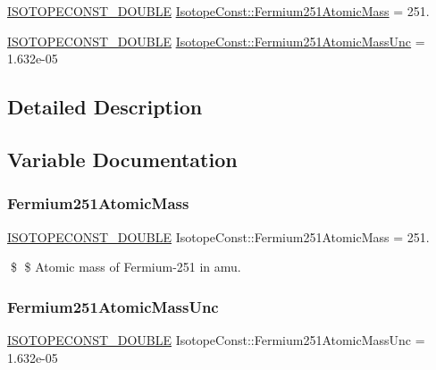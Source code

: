 \begin{DoxyCompactItemize}
\item 
\mbox{\hyperlink{group___isotope_const-_macros_ga8f45a7272ce02c0b4c65c44636ed719a}{I\+S\+O\+T\+O\+P\+E\+C\+O\+N\+S\+T\+\_\+\+D\+O\+U\+B\+LE}} \mbox{\hyperlink{group___isotope_const-_fermium-_fm251_ga72c1d25ba778ce4d444ea32fa1d19a0d}{Isotope\+Const\+::\+Fermium251\+Atomic\+Mass}} = 251.
\item 
\mbox{\hyperlink{group___isotope_const-_macros_ga8f45a7272ce02c0b4c65c44636ed719a}{I\+S\+O\+T\+O\+P\+E\+C\+O\+N\+S\+T\+\_\+\+D\+O\+U\+B\+LE}} \mbox{\hyperlink{group___isotope_const-_fermium-_fm251_ga301bdffa0dde7a800817c16291698988}{Isotope\+Const\+::\+Fermium251\+Atomic\+Mass\+Unc}} = 1.\+632e-\/05
\end{DoxyCompactItemize}


\subsection{Detailed Description}


\subsection{Variable Documentation}
\mbox{\label{group___isotope_const-_fermium-_fm251_ga72c1d25ba778ce4d444ea32fa1d19a0d}} 
\subsubsection{\texorpdfstring{Fermium251\+Atomic\+Mass}{Fermium251AtomicMass}}
{\footnotesize\ttfamily \mbox{\hyperlink{group___isotope_const-_macros_ga8f45a7272ce02c0b4c65c44636ed719a}{I\+S\+O\+T\+O\+P\+E\+C\+O\+N\+S\+T\+\_\+\+D\+O\+U\+B\+LE}} Isotope\+Const\+::\+Fermium251\+Atomic\+Mass = 251.}

\$ \$ Atomic mass of Fermium-\/251 in amu. \mbox{\label{group___isotope_const-_fermium-_fm251_ga301bdffa0dde7a800817c16291698988}} 
\subsubsection{\texorpdfstring{Fermium251\+Atomic\+Mass\+Unc}{Fermium251AtomicMassUnc}}
{\footnotesize\ttfamily \mbox{\hyperlink{group___isotope_const-_macros_ga8f45a7272ce02c0b4c65c44636ed719a}{I\+S\+O\+T\+O\+P\+E\+C\+O\+N\+S\+T\+\_\+\+D\+O\+U\+B\+LE}} Isotope\+Const\+::\+Fermium251\+Atomic\+Mass\+Unc = 1.\+632e-\/05}

